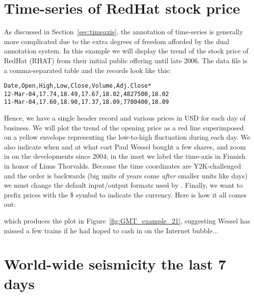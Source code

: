 \section{Time-series of RedHat stock price}

As discussed in Section~\ref{sec:timeaxis}, the annotation of time-series
is generally more complicated due to the extra degrees of freedom afforded
by the dual annotation system.  In this example we will display the trend
of the stock price of RedHat (RHAT) from their initial public offering until
late 2006.  The data file is a comma-separated table and the records
look like this:
\begin{verbatim}
Date,Open,High,Low,Close,Volume,Adj.Close*
12-Mar-04,17.74,18.49,17.67,18.02,4827500,18.02
11-Mar-04,17.60,18.90,17.37,18.09,7700400,18.09
\end{verbatim}
Hence, we have a single header record and various prices in USD for each
day of business.  We will plot the trend of the opening price as a red line superimposed on
a yellow envelope representing the low-to-high fluctuation during each day.  We
also indicate when and at what cost Paul Wessel bought a few shares, and zoom in
on the developments since 2004; in the inset we label the time-axis in Finnish in honor
of Linus Thorvalds.  Because the time coordinates are Y2K-challenged and the
order is backwards (big units of years come \emph{after} smaller units like
days) we must change the default input/output formats used by \GMT. Finally,
we want to prefix prices with the \$ symbol to indicate the currency.  Here is
how it all comes out:


which produces the plot in Figure~\ref{fig:GMT_example_21}, suggesting Wessel
has missed a few trains if he had hoped to cash in on the Internet bubble...



\section{World-wide seismicity the last 7 days}

